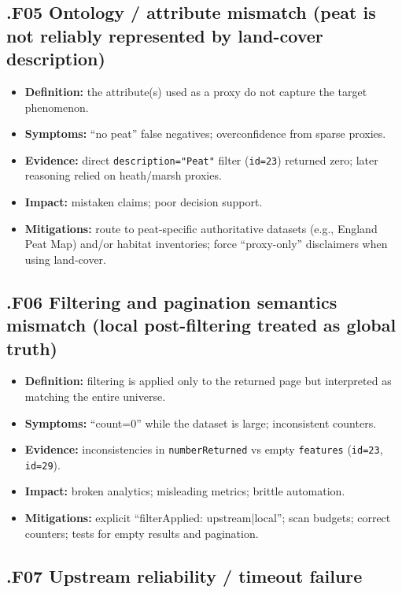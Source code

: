 \subsection*{.F05 Ontology / attribute mismatch (peat is not reliably represented by land-cover description)}

\begin{itemize}[leftmargin=*]
\item \textbf{Definition:} the attribute(s) used as a proxy do not capture the target phenomenon.
\item \textbf{Symptoms:} “no peat” false negatives; overconfidence from sparse proxies.
\item \textbf{Evidence:} direct \texttt{description="Peat"} filter (\texttt{id=23}) returned zero; later reasoning relied on heath/marsh proxies.
\item \textbf{Impact:} mistaken claims; poor decision support.
\item \textbf{Mitigations:} route to peat-specific authoritative datasets (e.g., England Peat Map) and/or habitat inventories; force “proxy-only” disclaimers when using land-cover.
\end{itemize}

\subsection*{.F06 Filtering and pagination semantics mismatch (local post-filtering treated as global truth)}

\begin{itemize}[leftmargin=*]
\item \textbf{Definition:} filtering is applied only to the returned page but interpreted as matching the entire universe.
\item \textbf{Symptoms:} “count=0” while the dataset is large; inconsistent counters.
\item \textbf{Evidence:} inconsistencies in \texttt{numberReturned} vs empty \texttt{features} (\texttt{id=23}, \texttt{id=29}).
\item \textbf{Impact:} broken analytics; misleading metrics; brittle automation.
\item \textbf{Mitigations:} explicit “filterApplied: upstream|local”; scan budgets; correct counters; tests for empty results and pagination.
\end{itemize}

\subsection*{.F07 Upstream reliability / timeout failure}

